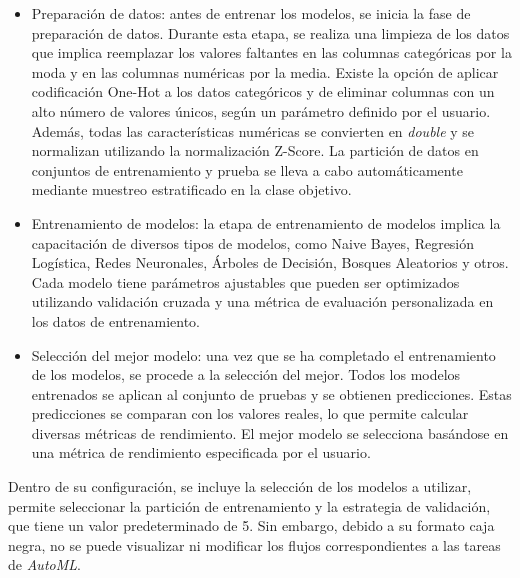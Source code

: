 \begin{itemize}
	\item Preparación de datos: antes de entrenar los modelos, se inicia la fase de preparación de datos. Durante esta etapa, se realiza una limpieza de los datos que implica reemplazar los valores faltantes en las columnas categóricas por la moda y en las columnas numéricas por la media. Existe la opción de aplicar codificación One-Hot a los datos categóricos y de eliminar columnas con un alto número de valores únicos, según un parámetro definido por el usuario. Además, todas las características numéricas se convierten en \textit{double} y se normalizan utilizando la normalización Z-Score. La partición de datos en conjuntos de entrenamiento y prueba se lleva a cabo automáticamente mediante muestreo estratificado en la clase objetivo.
	\item Entrenamiento de modelos: la etapa de entrenamiento de modelos implica la capacitación de diversos tipos de modelos, como Naive Bayes, Regresión Logística, Redes Neuronales, Árboles de Decisión, Bosques Aleatorios y otros. Cada modelo tiene parámetros ajustables que pueden ser optimizados utilizando validación cruzada y una métrica de evaluación personalizada en los datos de entrenamiento. 
	\item Selección del mejor modelo: una vez que se ha completado el entrenamiento de los modelos, se procede a la selección del mejor. Todos los modelos entrenados se aplican al conjunto de pruebas y se obtienen predicciones. Estas predicciones se comparan con los valores reales, lo que permite calcular diversas métricas de rendimiento. El mejor modelo se selecciona basándose en una métrica de rendimiento especificada por el usuario.
\end{itemize}

Dentro de su configuración, se incluye la selección de los modelos a utilizar, permite seleccionar la partición de entrenamiento y la estrategia de validación, que tiene un valor predeterminado de 5. Sin embargo, debido a su formato caja negra, no se puede visualizar ni modificar los flujos correspondientes a las tareas de \textit{AutoML}.

